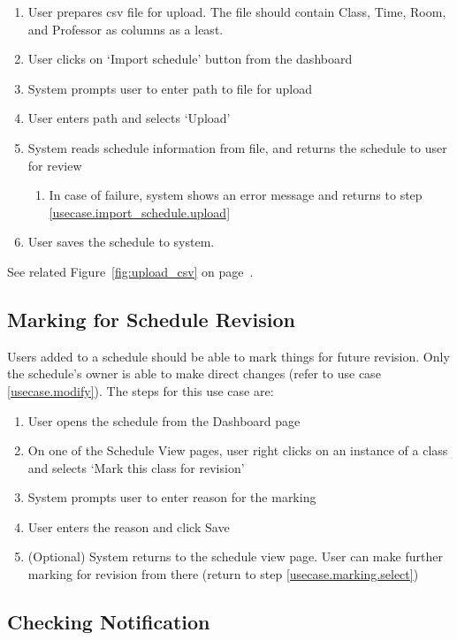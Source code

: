 \documentclass{extarticle}
\begin{document}
\begin{enumerate}
\item User prepares csv file for upload. The file should contain Class, Time, Room, and Professor as columns as a least.
\item User clicks on `Import schedule' button from the dashboard
\item \label{usecase.import_schedule.upload} System prompts user to enter path to file for upload
\item User enters path and selects `Upload'
\item System reads schedule information from file, and returns the schedule to user for review
	\begin{enumerate}
	\item In case of failure, system shows an error message and returns to step \ref{usecase.import_schedule.upload}
	\end{enumerate}
\item User saves the schedule to system.
\end{enumerate}

See related Figure~\ref{fig:upload_csv} on page~\pageref{fig:upload_csv}.

\subsection{Marking for Schedule Revision}

Users added to a schedule should be able to mark things for future revision. Only the schedule's owner is able to make direct changes (refer to use case \ref{usecase.modify}). The steps for this use case are:

\begin{enumerate}
\item User opens the schedule from the Dashboard page
\item \label{usecase.marking.select} On one of the Schedule View pages, user right clicks on an instance of a class and selects `Mark this class for revision'
\item System prompts user to enter reason for the marking
\item User enters the reason and click Save
\item (Optional) System returns to the schedule view page. User can make further marking for revision from there (return to step \ref{usecase.marking.select})
\end{enumerate}

\subsection{Checking Notification}
\end{document}
